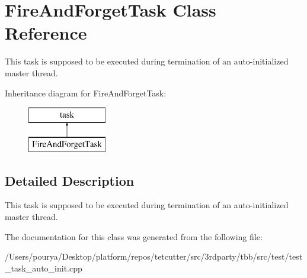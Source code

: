 \hypertarget{classFireAndForgetTask}{}\section{Fire\+And\+Forget\+Task Class Reference}
\label{classFireAndForgetTask}


This task is supposed to be executed during termination of an auto-\/initialized master thread.  


Inheritance diagram for Fire\+And\+Forget\+Task\+:\begin{figure}[H]
\begin{center}
\leavevmode
\includegraphics[height=2.000000cm]{classFireAndForgetTask}
\end{center}
\end{figure}


\subsection{Detailed Description}
This task is supposed to be executed during termination of an auto-\/initialized master thread. 

The documentation for this class was generated from the following file\+:\begin{DoxyCompactItemize}
\item 
/\+Users/pourya/\+Desktop/platform/repos/tetcutter/src/3rdparty/tbb/src/test/test\+\_\+task\+\_\+auto\+\_\+init.\+cpp\end{DoxyCompactItemize}
